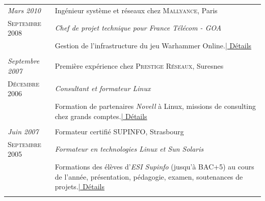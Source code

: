 \documentclass[a4paper,10pt]{article}
\begin{document}
\begin{tabular}{p{}|p{}}
 \emph{Mars 2010} & Ingénieur système et réseaux chez \textsc{Mallyance}, Paris \\\textsc{Septembre 2008}&\emph{Chef de projet technique pour France Télécom - GOA}\\&\footnotesize{Gestion de l'infrastructure du jeu Warhammer Online.\hyperlink{mallyance}{\hfill | \footnotesize Détails}}\\\multicolumn{2}{c}{} \\
 \emph{Septembre 2007} & Première expérience chez \textsc{Prestige Réseaux}, Suresnes \\\textsc{Décembre 2006}&\emph{Consultant et formateur Linux}\\&\footnotesize{Formation de partenaires \emph{Novell} à Linux, missions de consulting chez grands comptes.\newline \hyperlink{prestige}{\hfill | \footnotesize Détails}}\\\multicolumn{2}{c}{} \\
 \emph{Juin 2007} & Formateur certifié \textsc{SUPINFO}, Strasbourg \\\textsc{Septembre 2005}&\emph{Formateur en technologies Linux et Sun Solaris}\\&\footnotesize{Formations des élèves d'\emph{ESI Supinfo} (jusqu'à BAC+5) au cours de l'année, présentation, pédagogie, examen, soutenances de projets.\newline \hyperlink{supinfo}{\hfill | \footnotesize Détails}}\\\multicolumn{2}{c}{}
\end{tabular}
\end{document}
